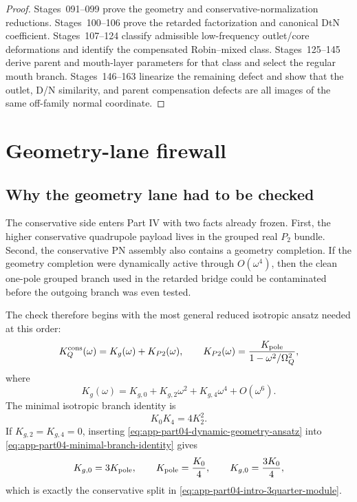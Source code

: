 \begin{proof}
Stages~091--099 prove the geometry and conservative-normalization reductions.  Stages~100--106 prove the retarded factorization and canonical DtN coefficient.  Stages~107--124 classify admissible low-frequency outlet/core deformations and identify the compensated Robin--mixed class.  Stages~125--145 derive parent and mouth-layer parameters for that class and select the regular mouth branch.  Stages~146--163 linearize the remaining defect and show that the outlet, D/N similarity, and parent compensation defects are all images of the same off-family normal coordinate.
\end{proof}

\section{Geometry-lane firewall}
\label{sec:app-part04_geometry_retarded_mouth:geometry-lane-firewall}

\subsection{Why the geometry lane had to be checked}
\label{subsec:app-part04-geometry-why}

The conservative side enters Part IV with two facts already frozen.  First, the higher conservative quadrupole payload lives in the grouped real \(P_2\) bundle.  Second, the conservative PN assembly also contains a geometry completion.  If the geometry completion were dynamically active through \(O(\omega^4)\), then the clean one-pole grouped branch used in the retarded bridge could be contaminated before the outgoing branch was even tested.

The check therefore begins with the most general reduced isotropic ansatz needed at this order:
\begin{equation}
\label{eq:app-part04-dynamic-geometry-ansatz}
K_Q^{\rm cons}(\omega)
=
K_g(\omega)+K_{P2}(\omega),
\qquad
K_{P2}(\omega)=\frac{K_{\rm pole}}{1-\omega^2/\Omega_Q^2},
\end{equation}
where
\begin{equation}
\label{eq:app-part04-geometry-even-expansion}
K_g(\omega)=K_{g,0}+K_{g,2}\omega^2+K_{g,4}\omega^4+O(\omega^6).
\end{equation}
The minimal isotropic branch identity is
\begin{equation}
\label{eq:app-part04-minimal-branch-identity}
K_0K_4=4K_2^2.
\end{equation}
If \(K_{g,2}=K_{g,4}=0\), inserting \eqref{eq:app-part04-dynamic-geometry-ansatz} into \eqref{eq:app-part04-minimal-branch-identity} gives
\begin{equation}
\label{eq:app-part04-geometry-static-split}
K_{g,0}=3K_{\rm pole},
\qquad
K_{\rm pole}=\frac{K_0}{4},
\qquad
K_{g,0}=\frac{3K_0}{4},
\end{equation}
which is exactly the conservative split in \eqref{eq:app-part04-intro-3quarter-module}.

